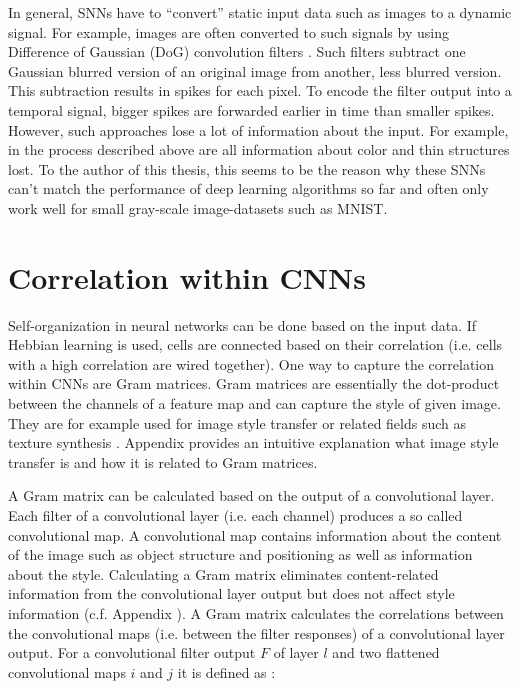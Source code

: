 In general, SNNs have to ``convert'' static input data such as images to a dynamic signal.
For example, images are often converted to such signals by using Difference of Gaussian (DoG) convolution filters .
Such filters subtract one Gaussian blurred version of an original image from another, less blurred version.
This subtraction results in spikes for each pixel.
To encode the filter output into a temporal signal, bigger spikes are forwarded earlier in time than smaller spikes.
However, such approaches lose a lot of information about the input.
For example, in the process described above are all information about color and thin structures lost.
To the author of this thesis, this seems to be the reason why these SNNs can't match the performance of deep learning algorithms so far and often only work well for small gray-scale image-datasets such as MNIST.

\section{Correlation within CNNs}
Self-organization in neural networks can be done based on the input data.
If Hebbian learning is used, cells are connected based on their correlation (i.e. cells with a high correlation are wired together).
One way to capture the correlation within CNNs are Gram matrices.
Gram matrices are essentially the dot-product between the channels of a feature map and can capture the style of given image.
They are for example used for image style transfer or related fields such as texture synthesis .
Appendix  provides an intuitive explanation what image style transfer is and how it is related to Gram matrices.

A Gram matrix can be calculated based on the output of a convolutional layer.
Each filter of a convolutional layer (i.e. each channel) produces a so called convolutional map.
A convolutional map contains information about the content of the image such as object structure and positioning as well as information about the style.
Calculating a Gram matrix eliminates content-related information from the convolutional layer output but does not affect style information (c.f. Appendix ).
A Gram matrix calculates the correlations between the convolutional maps (i.e. between the filter responses) of a convolutional layer output.
For a convolutional filter output $F$ of layer $l$ and two flattened convolutional maps $i$ and $j$ it is defined as :


